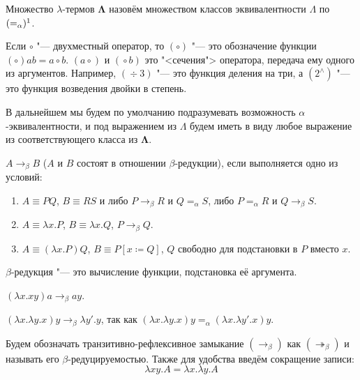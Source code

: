 \begin{definition}
    Множество $\lambda$-термов $\boldsymbol{\Lambda}$ назовём множеством классов эквивалентности $\Lambda$ по $(=_{\alpha})\footnotemark$.
\end{definition}
\footnotetext
{Если $\circ$ "--- двухместный оператор, то $\left(\circ\right)$ "--- это обозначение функции $\left(\circ\right) a b = a \circ b$.
$\left(a \operatorname{\circ}\right)$ и $\left(\operatorname\circ b\right)$ это "<сечения"> оператора, передача ему одного из аргументов.
Например, $\left(\operatorname\div 3\right)$ "--- это функция деления на три,
а $\left(2^\wedge\right)$ "--- это функция возведения двойки в степень.}

В дальнейшем мы будем по умолчанию подразумевать возможность $\alpha$-эквивалентности,
и под выражением из $\Lambda$ будем иметь в виду любое выражение из соответствующего класса из $\boldsymbol\Lambda$.

\begin{definition}
    $A\to_{\beta}B$ ($A$ и $B$ состоят в отношении $\beta$-редукции), если выполняется одно из условий:
    \begin{enumerate}
        \item $A\equiv{}PQ$, $B\equiv{}RS$ и либо $P\to_{\beta}R$ и $Q=_{\alpha}S$,
            либо $P=_{\alpha}R$ и $Q\to_{\beta}S$.
        \item $A\equiv{}\lambda{}x.P$, $B\equiv{}\lambda x.Q$, $P\to_{\beta}Q$.
        \item $A\equiv{}(\lambda{}x.P)Q$, $B\equiv{}P [x\coloneqq{}Q]$, $Q$ свободно для подстановки в $P$ вместо $x$.
    \end{enumerate}
\end{definition}

$\beta$-редукция "--- это вычисление функции, подстановка её аргумента.

\begin{example} $(\lambda x . x y) a \to_\beta a y$.
\end{example}

\begin{example} $(\lambda x.\lambda y.x) y \to_\beta \lambda y' . y$, так как
    $(\lambda x.\lambda y.x) y =_\alpha (\lambda x.\lambda y'.x) y$.
\end{example}

Будем обозначать транзитивно-рефлексивное замыкание $\left(\to_\beta\right)$ как $\left(\twoheadrightarrow_{\beta}\right)$
и называть его $\beta$-редуцируемостью.
Также для удобства введём сокращение записи:
\[
    \lambda x y . A = \lambda x . \lambda y . A
\]


